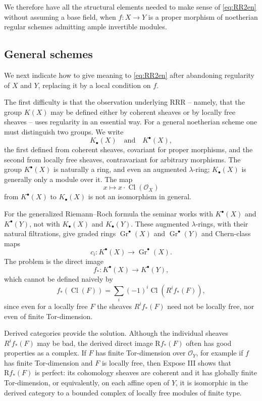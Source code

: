 \documentclass[14pt]{extarticle}
\newcommand{\cO}{\mathcal O}
\newcommand{\Gr}{\operatorname{Gr}}
\newcommand{\Cl}{\operatorname{Cl}}
\newcommand{\R}{\mathrm R}
\begin{document}
We therefore have all the structural elements needed to make sense of \eqref{eq:RR2en} without assuming a base field, when $f:X\to Y$ is a proper morphism of noetherian regular schemes admitting ample invertible modules.

\subsection{General schemes}

We next indicate how to give meaning to \eqref{eq:RR2en} after abandoning regularity of $X$ and $Y$, replacing it by a local condition on $f$.

The first difficulty is that the observation underlying RRR -- namely, that the group $K(X)$ may be defined either by coherent sheaves or by locally free sheaves -- uses regularity in an essential way. For a general noetherian scheme one must distinguish two groups. We write
\[
   K_{\bullet}(X) \quad\text{and}\quad K^{\bullet}(X),
\]
the first defined from coherent sheaves, covariant for proper morphisms, and the second from locally free sheaves, contravariant for arbitrary morphisms. The group $K^{\bullet}(X)$ is naturally a ring, and even an augmented $\lambda$-ring; $K_{\bullet}(X)$ is generally only a module over it. The map
\[
   x\longmapsto x\cdot \Cl(\cO_X)
\]
from $K^{\bullet}(X)$ to $K_{\bullet}(X)$ is not an isomorphism in general.

For the generalized Riemann--Roch formula the seminar works with $K^{\bullet}(X)$ and $K^{\bullet}(Y)$, not with $K_{\bullet}(X)$ and $K_{\bullet}(Y)$. These augmented $\lambda$-rings, with their natural filtrations, give graded rings $\Gr^{\bullet}(X)$ and $\Gr^{\bullet}(Y)$ and Chern-class maps
\[
   c_i:K^{\bullet}(X)\to\Gr^{\bullet}(X).
\]
The problem is the direct image
\begin{equation}\label{eq:fstarK}
   f_*:K^{\bullet}(X)\to K^{\bullet}(Y),
\end{equation}
which cannot be defined naively by
\[
   f_*(\Cl(F))=\sum_i(-1)^i\Cl(R^if_*(F)),
\]
since even for a locally free $F$ the sheaves $R^if_*(F)$ need not be locally free, nor even of finite Tor-dimension.

Derived categories provide the solution. Although the individual sheaves $R^if_*(F)$ may be bad, the derived direct image $\R f_*(F)$ often has good properties as a complex. If $F$ has finite Tor-dimension over $\cO_Y$, for example if $f$ has finite Tor-dimension and $F$ is locally free, then Expose III shows that $\R f_*(F)$ is perfect: its cohomology sheaves are coherent and it has globally finite Tor-dimension, or equivalently, on each affine open of $Y$, it is isomorphic in the derived category to a bounded complex of locally free modules of finite type.
\end{document}

